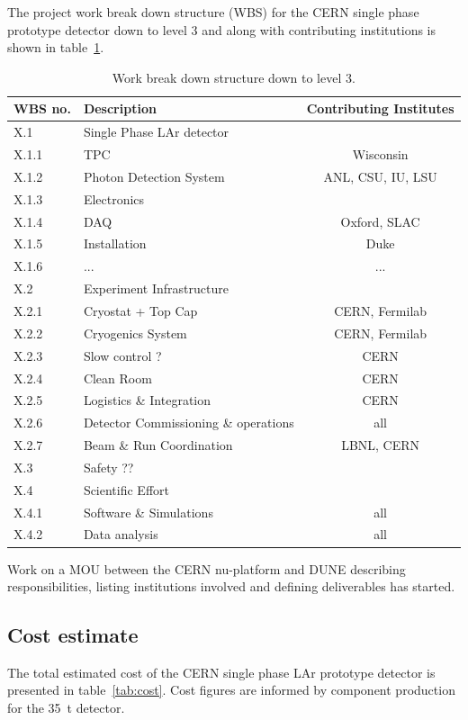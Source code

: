 The project work break down structure (WBS) for the CERN single phase prototype detector down to level 3 and along with contributing institutions is shown in table~\ref{tab:wbs}.
%
\begin{table}[h]
\centering
\begin{tabular}{|l l c|}
\hline
\textbf{WBS no. } & \textbf{Description}  & \textbf{Contributing Institutes}  \\ \hline

X.1 & Single Phase LAr detector & \\
X.1.1 & TPC & Wisconsin \\
X.1.2 & Photon Detection System  &  ANL, CSU, IU, LSU \\
X.1.3 & Electronics  &   \\
X.1.4 &  DAQ & Oxford, SLAC  \\
X.1.5 & Installation  & Duke  \\
X.1.6 & ...  & ...  \\ \hline

X.2 & Experiment Infrastructure  &   \\
X.2.1 & Cryostat + Top Cap &  CERN, Fermilab \\
X.2.2 & Cryogenics System  &  CERN, Fermilab \\
X.2.3 &  Slow control ? &  CERN \\
X.2.4 &  Clean Room & CERN   \\ 
X.2.5 &  Logistics \& Integration & CERN  \\ 
X.2.6 &  Detector Commissioning \& operations &  all  \\ 
X.2.7 &  Beam \& Run Coordination &  LBNL, CERN \\ \hline

X.3 &  Safety ?? &   \\ \hline

X.4 & Scientific Effort &    \\ 
X.4.1 & Software \& Simulations &  all  \\
X.4.2 & Data analysis &  all  \\ \hline

\end{tabular}
\caption{Work break down structure down to level 3.}
\label{tab:wbs}
\end{table}
%
Work on a MOU between the CERN nu-platform and DUNE describing responsibilities, listing institutions involved and defining deliverables has started. 
%

\subsection{Cost estimate}
The total estimated cost of the CERN single phase LAr prototype detector is presented in table~\ref{tab:cost}.
Cost figures are informed by component production for the 35~t detector.


